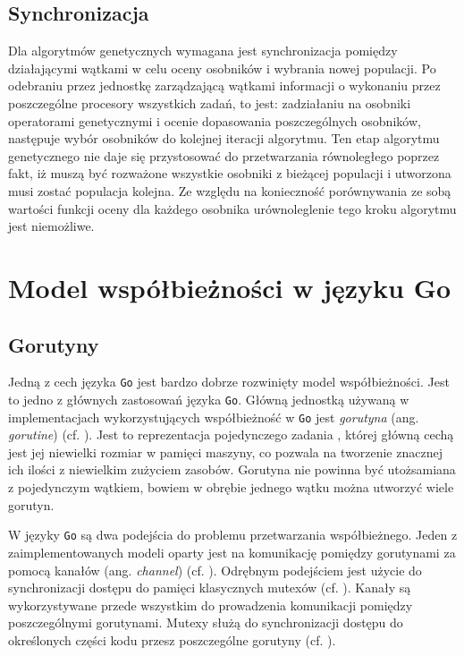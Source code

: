 \subsection{Synchronizacja}
Dla algorytmów genetycznych wymagana jest synchronizacja pomiędzy działającymi wątkami w celu oceny osobników i wybrania nowej populacji. Po odebraniu przez jednostkę zarządzającą wątkami informacji o wykonaniu przez poszczególne procesory wszystkich zadań, to jest: zadziałaniu na osobniki operatorami genetycznymi i ocenie dopasowania poszczególnych osobników, następuje wybór osobników do kolejnej iteracji algorytmu. Ten etap algorytmu genetycznego nie daje się przystosować do przetwarzania równoległego poprzez fakt, iż muszą być rozważone wszystkie osobniki z bieżącej populacji i utworzona musi zostać populacja kolejna. Ze względu na konieczność porównywania ze sobą wartości funkcji oceny dla każdego osobnika urównoleglenie tego kroku algorytmu jest niemożliwe.

\section{Model współbieżności w języku Go}
\label{subsec:concurrency_in_go}

\subsection{Gorutyny}
\label{subsec:gorutines}
Jedną z cech języka \texttt{Go} jest bardzo dobrze rozwinięty model współbieżności. Jest to jedno z głównych zastosowań języka \texttt{Go}. Główną jednostką używaną w implementacjach wykorzystujących współbieżność w \texttt{Go} jest \textit{gorutyna} (ang. \textit{gorutine}) (cf. \cite{GoByExampleGorutine}). Jest to reprezentacja pojedynczego zadania , której główną cechą jest jej niewielki rozmiar w pamięci maszyny, co pozwala na tworzenie znacznej ich ilości z niewielkim zużyciem zasobów. Gorutyna nie powinna być utożsamiana z pojedynczym wątkiem, bowiem w obrębie jednego wątku można utworzyć wiele gorutyn.

W języky \texttt{Go} są dwa podejścia do problemu przetwarzania współbieżnego. Jeden z zaimplementowanych modeli oparty jest na komunikację pomiędzy gorutynami za pomocą kanałów (ang. \textit{channel}) (cf. \cite{GoByExampleChannel}). Odrębnym podejściem jest użycie do synchronizacji dostępu do pamięci klasycznych mutexów (cf. \cite{GoDocsSync}). Kanały są wykorzystywane przede wszystkim do prowadzenia komunikacji pomiędzy poszczególnymi gorutynami. Mutexy służą do synchronizacji dostępu do określonych części kodu przesz poszczególne gorutyny (cf. \cite{Gorutinse}).

